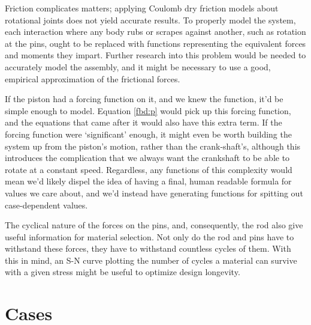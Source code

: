\documentclass[nofoot,pdf-a,balance,colorlinks,upint,subscriptcorrection,varvw,mathalfa=cal=boondoxo]{asmeconf}
\begin{document}
    Friction complicates matters; applying Coulomb dry friction models about rotational joints does not yield accurate results. To properly model the system, each interaction where any body rubs or scrapes against another, such as rotation at the pins, ought to be replaced with functions representing the equivalent forces and moments they impart. Further research into this problem would be needed to accurately model the assembly, and it might be necessary to use a good, empirical approximation of the frictional forces.

    If the piston had a forcing function on it, and we knew the function, it'd be simple enough to model. Equation \eqref{fbd:p} would pick up this forcing function, and the equations that came after it would also have this extra term. If the forcing function were `significant' enough, it might even be worth building the system up from the piston's motion, rather than the crank-shaft's, although this introduces the complication that we always want the crankshaft to be able to rotate at a constant speed. Regardless, any functions of this complexity would mean we'd likely dispel the idea of having a final, human readable formula for values we care about, and we'd instead have generating functions for spitting out case-dependent values.

    The cyclical nature of the forces on the pins, and, consequently, the rod also give useful information for material selection. Not only do the rod and pins have to withstand these forces, they have to withstand countless cycles of them. With this in mind, an S-N curve plotting the number of cycles a material can survive with a given stress might be useful to optimize design longevity.


    \appendix
    \section{Cases}\label{appendix:cases}
	  \begin{table}[H]
        \caption[Table]{Cases to consider (Given)}\label{tab:givenCases}
    \end{table}
\end{document}
